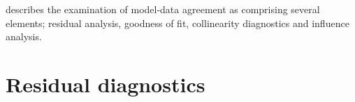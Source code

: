 \documentclass[12pt, a4paper]{report}
\theoremstyle{plain}
\theoremstyle{definition}
\theoremstyle{remark}
\begin{document}
\citet{schabenberger} describes the examination of model-data agreement as comprising several elements; residual analysis, goodness of fit, collinearity diagnostics and influence analysis.







	\section{Residual diagnostics} %
\end{document}
